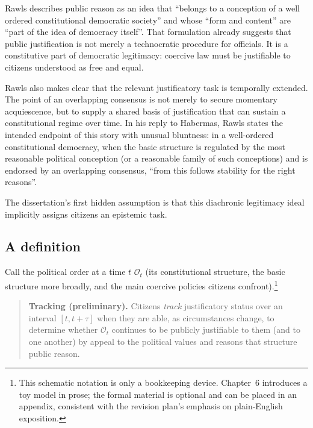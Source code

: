 \documentclass[12pt]{report}
\begin{document}
Rawls describes public reason as an idea that \enquote{belongs to a conception of a well ordered constitutional democratic society} and whose \enquote{form and content} are \enquote{part of the idea of democracy itself}.\parencite[p.~765]{rawls1997public} That formulation already suggests that public justification is not merely a technocratic procedure for officials. It is a constitutive part of democratic legitimacy: coercive law must be justifiable to citizens understood as free and equal.

Rawls also makes clear that the relevant justificatory task is temporally extended. The point of an overlapping consensus is not merely to secure momentary acquiescence, but to supply a shared basis of justification that can sustain a constitutional regime over time.\parencite[p.~1]{rawls1987overlapping} In his reply to Habermas, Rawls states the intended endpoint of this story with unusual bluntness: in a well-ordered constitutional democracy, when the basic structure is regulated by the most reasonable political conception (or a reasonable family of such conceptions) and is endorsed by an overlapping consensus, \enquote{from this follows stability for the right reasons}.\parencite[p.~147]{rawls1995reply}

The dissertation’s first hidden assumption is that this diachronic legitimacy ideal implicitly assigns citizens an epistemic task.

\subsection{A definition}

Call the political order at a time \(t\) \(\mathcal{O}_t\) (its constitutional structure, the basic structure more broadly, and the main coercive policies citizens confront).\footnote{This schematic notation is only a bookkeeping device. Chapter~6 introduces a toy model in prose; the formal material is optional and can be placed in an appendix, consistent with the revision plan’s emphasis on plain-English exposition.}

\begin{quote}
\textbf{Tracking (preliminary).} Citizens \emph{track} justificatory status over an interval \([t,t+\tau]\) when they are able, as circumstances change, to determine whether \(\mathcal{O}_t\) continues to be publicly justifiable to them (and to one another) by appeal to the political values and reasons that structure public reason.
\end{quote}
\end{document}
